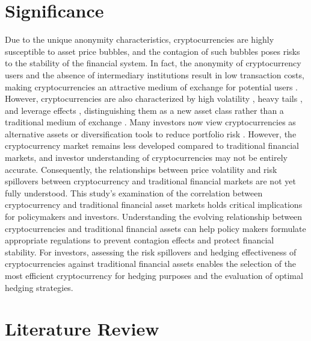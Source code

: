 \documentclass{article}
\begin{document}
\section{Significance}
Due to the unique anonymity characteristics, cryptocurrencies are highly susceptible to asset price bubbles, and the contagion of such bubbles poses risks to the stability of the financial system. In fact, the anonymity of cryptocurrency users and the absence of intermediary institutions result in low transaction costs, making cryptocurrencies an attractive medium of exchange for potential users \cite{baur2018b}. However, cryptocurrencies are also characterized by high volatility \cite{chu2017,katsiampa2017}, heavy tails \cite{osterrieder2017,gkillas2018,phillip2018}, and leverage effects \cite{phillip2018}, distinguishing them as a new asset class rather than a traditional medium of exchange \cite{yermack2015,baek2015,dyhrberg2016b}. Many investors now view cryptocurrencies as alternative assets or diversification tools to reduce portfolio risk \cite{tiwari2019}. However, the cryptocurrency market remains less developed compared to traditional financial markets, and investor understanding of cryptocurrencies may not be entirely accurate. Consequently, the relationships between price volatility and risk spillovers between cryptocurrency and traditional financial markets are not yet fully understood.
This study’s examination of the correlation between cryptocurrency and traditional financial asset markets holds critical implications for policymakers and investors. Understanding the evolving relationship between cryptocurrencies and traditional financial assets can help policy makers formulate appropriate regulations to prevent contagion effects and protect financial stability. For investors, assessing the risk spillovers and hedging effectiveness of cryptocurrencies against traditional financial assets enables the selection of the most efficient cryptocurrency for hedging purposes and the evaluation of optimal hedging strategies.

\section{Literature Review}
\end{document}
